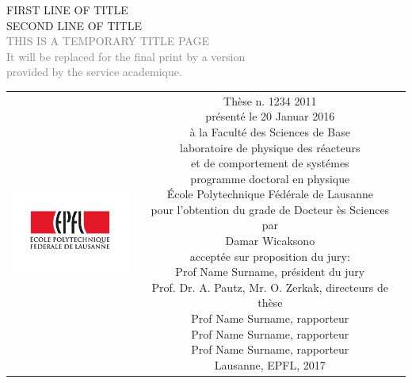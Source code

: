 \begin{titlepage}
\begin{center}
\sffamily


\null\vspace{2cm}
{\huge FIRST LINE OF TITLE \\[12pt] SECOND LINE OF TITLE} \\[24pt] 
\textcolor{gray}{\small{THIS IS A TEMPORARY TITLE PAGE \\ It will be replaced for the final print by a version \\ provided by the service academique.}}
    
\vfill

\begin{tabular} {cc}
\parbox{0.3\textwidth}{\includegraphics[width=4cm]{images/epfl}}
&
\parbox{0.7\textwidth}{%
	Thèse n. 1234 2011\\
	présenté le 20 Januar 2016\\
	à la Faculté des Sciences de Base\\
	laboratoire de physique des réacteurs \\
	et de comportement de systémes\\
	programme doctoral en physique\\
%
	École Polytechnique Fédérale de Lausanne\\[6pt]
	pour l'obtention du grade de Docteur ès Sciences\\
	par\\ [4pt]
	\null \hspace{3em} Damar Wicaksono\\[9pt]
%
\small
acceptée sur proposition du jury:\\[4pt]
%
    Prof Name Surname, président du jury\\
    Prof. Dr. A. Pautz, Mr. O. Zerkak, directeurs de thèse\\
    Prof Name Surname, rapporteur\\
    Prof Name Surname, rapporteur\\
    Prof Name Surname, rapporteur\\[12pt]
%
Lausanne, EPFL, 2017}
\end{tabular}
\end{center}
\vspace{2cm}
\end{titlepage}



